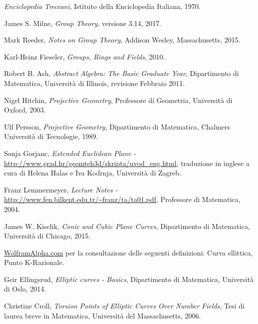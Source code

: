 \documentclass[a4paper,12pt]{tesiinfo}
\begin{document}
\begin{thebibliography}{99}

  \emph{Enciclopedia Treccani},
  Istituto della Enciclopedia Italiana,
  1970.


  James S. Milne,
  \emph{Group Theory}, 
  versione 3.14, 
  2017.
  
  Mark Reeder,
  \emph{Notes on Group Theory},
  Addison Wesley, Massachusetts,
  2015.
  
  Karl-Heinz Fieseler,
  \emph{Groups, Rings and Fields},
  2010.
  
  Robert B. Ash,
  \emph{Abstract Algebra: The Basic Graduate Year},
  Dipartimento di Matematica,
  Universit\`a di Illinois,
  revisione Febbraio 2011.
  
  Nigel Hitchin,
  \emph{Projective Geometry},
  Professore di Geometria,
  Universit\`a di Oxford,
  2003.
  
  Ulf Persson,
  \emph{Projective Geometry},
  Dipartimento di Matematica,
  Chalmers Universit\`a di Tecnologie,
  1989.
  
  Sonja Gorjanc,
  \emph{Extended Euclidean Plane - } 
  \url{http://www.grad.hr/geomteh3d/skripta/uvod_eng.html},
  traduzione in inglese a cura di Helena Halas e Iva Kodrnja,
  Universit\`a di Zagreb.
  
  Franz Lemmermeyer,
  \emph{Lecture Notes -}
  \url{http://www.fen.bilkent.edu.tr/~franz/ta/ta01.pdf},
  Professore di Matematica,
  2004.
  
  James W. Kiselik,
  \emph{Conic and Cubic Plane Curves},
  Dipartimento di Matematica,
  Universit\`a di Chicago,
  2015.

  \url{WolframAlpha.com} per la consultazione delle seguenti definizioni: Curva ellittica, Punto K-Razionale.
  
  Geir Ellingsrud,
  \emph{Elliptic curves - Basics},
  Dipartimento di Matematica,
  Universit\`a di Oslo,
  2014.
  
  Christine Croll,
  \emph{Torsion Points of Elliptic Curves Over Number Fields},
  Tesi di laurea breve in Matematica,
  Universit\`a del Massachusetts,
  2006.
  

\end{thebibliography}
\end{document}
